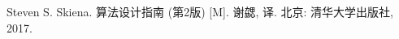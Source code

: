 
\begin{thebibliography}{0}


Steven S. Skiena. 算法设计指南 (第2版) [M]. 谢勰, 译. 北京: 清华大学出版社, 2017.

\end{thebibliography}

